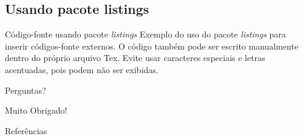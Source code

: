 \documentclass[darkblue]{beamer}
\begin{document}
			\subsection{Usando pacote listings}
				\begin{frame}{Código-fonte usando pacote \textit{listings}}
					Exemplo do uso do pacote \textit{listings} para inserir códigos-fonte externos.
					O código também pode ser escrito manualmente dentro do próprio arquivo Tex.
					Evite usar caracteres especiais e letras acentuadas, pois podem não ser exibidas.
				
					
				\end{frame}				
	
	\begin{frame}
		\label{perg}
		\begin{center} 
			\Huge Perguntas?
		\end{center} 
	\end{frame}
	
	\begin{frame}
		\begin{center} 
			\Huge Muito Obrigado!
		\end{center} 
	\end{frame}
	
	
	\begin{frame}{Referências}
		\nocite{Tantau2015,Cassidy2013}
	\end{frame}
	
\end{document}
